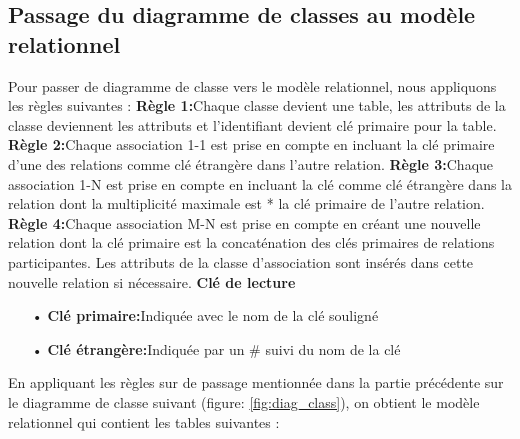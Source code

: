 \documentclass[edit,12pt,a4paper,ChapStyle,oneside,doubleinterligne]{report}
\begin{document}
\subsection{Passage du diagramme de classes au modèle relationnel }
Pour passer de diagramme de classe vers le modèle relationnel, nous appliquons les règles suivantes :
\newline
\textbf{Règle 1:}Chaque classe devient une table, les attributs de la classe deviennent
les attributs et l’identifiant devient clé primaire pour la table.
\newline
\textbf{Règle 2:}Chaque association 1-1 est prise en compte en incluant la clé primaire
d’une des relations comme clé étrangère dans l’autre relation.
\newline
\textbf{Règle 3:}Chaque association 1-N est prise en compte en incluant la clé comme
clé étrangère dans la relation dont la multiplicité maximale est * la clé primaire
de l’autre relation.
\newline
\textbf{Règle 4:}Chaque association M-N est prise en compte en créant une nouvelle
relation dont la clé primaire est la concaténation des clés primaires de relations
participantes. Les attributs de la classe d’association sont insérés dans cette nouvelle relation si nécessaire.
\newline \phantom{hassane} \newline
\textbf{Clé de lecture}
\begin{itemize}
    \item [•] \textbf{Clé primaire:}Indiquée avec le nom de la clé souligné
    \item [•] \textbf{Clé étrangère:}Indiquée par un \# suivi du nom de la clé
\end{itemize}
En appliquant les règles sur de passage mentionnée dans la partie précédente sur le diagramme de classe suivant (figure: \ref{fig:diag_class}), on obtient le modèle relationnel qui contient les tables suivantes :
\end{document}

